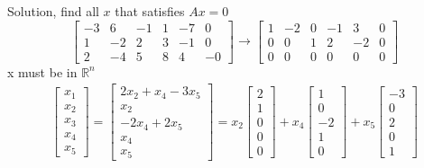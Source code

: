 \documentclass{article}
\begin{document}
    Solution, find all $ x $ that satisfies $ Ax=0 $
    \[
        \begin{bmatrix}
            -3 &6 &-1 &1 &-7 &0\\
            1 &-2 &2 &3 &-1 &0\\
            2 &-4 &5 &8 &4 &-0
        \end{bmatrix} \to 
        \begin{bmatrix}
            1 &-2 &0 &-1 &3 &0\\
            0 &0 &1 &2 &-2 &0\\
            0 &0 &0 &0 &0 &0 
        \end{bmatrix}
    \]
   x must be in $ \mathbb{R}^{n} $
   \[
       \begin{gathered}
       \begin{bmatrix}
           x_{1}\\
           x_{2}\\
           x_{3}\\
           x_{4}\\
           x_{5}     
       \end{bmatrix} = 
       \begin{bmatrix}
           2x_{2} + x_{4} - 3x_{5}\\
           x_{2}\\
           -2x_{4} + 2x_{5}\\
           x_{4}\\
           x_{5}   
       \end{bmatrix} = 
       x_{2} \begin{bmatrix}
           2\\
           1\\
           0\\
           0\\
           0
       \end{bmatrix} + x_{4}\begin{bmatrix}
           1\\
           0\\
           -2\\
           1\\
           0
       \end{bmatrix} + x_{5}\begin{bmatrix}
           -3\\
           0\\
           2\\
           0\\
           1
       \end{bmatrix} 
       \end{gathered}
   \]
\end{document}
